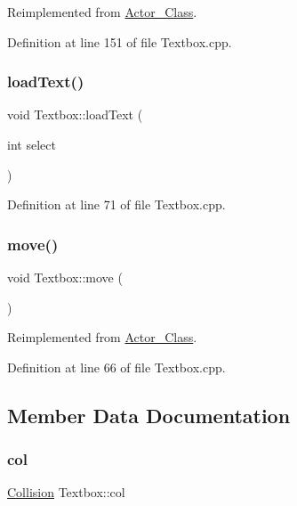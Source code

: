 Reimplemented from \hyperlink{class_actor___class_ab33216a3ce0c856bdc16231c71ae35c2}{Actor\+\_\+\+Class}.



Definition at line 151 of file Textbox.\+cpp.

\hypertarget{class_textbox_a0a58c0b828fb627bd21c8156d279e082}{}\label{class_textbox_a0a58c0b828fb627bd21c8156d279e082} 
\subsubsection{\texorpdfstring{load\+Text()}{loadText()}}
{\footnotesize\ttfamily void Textbox\+::load\+Text (\begin{DoxyParamCaption}\item[{int}]{select }\end{DoxyParamCaption})}



Definition at line 71 of file Textbox.\+cpp.

\hypertarget{class_textbox_a4680a3e6bbaa33dc57a585c7e0072b0a}{}\label{class_textbox_a4680a3e6bbaa33dc57a585c7e0072b0a} 
\subsubsection{\texorpdfstring{move()}{move()}}
{\footnotesize\ttfamily void Textbox\+::move (\begin{DoxyParamCaption}{ }\end{DoxyParamCaption})\hspace{0.3cm}{\ttfamily [virtual]}}



Reimplemented from \hyperlink{class_actor___class_af1764a94c5410ba8476f56553cd2c327}{Actor\+\_\+\+Class}.



Definition at line 66 of file Textbox.\+cpp.



\subsection{Member Data Documentation}
\hypertarget{class_textbox_ad89bdee3ead7d89dca3e1ba1468c272c}{}\label{class_textbox_ad89bdee3ead7d89dca3e1ba1468c272c} 
\subsubsection{\texorpdfstring{col}{col}}
{\footnotesize\ttfamily \hyperlink{class_collision}{Collision} Textbox\+::col}




